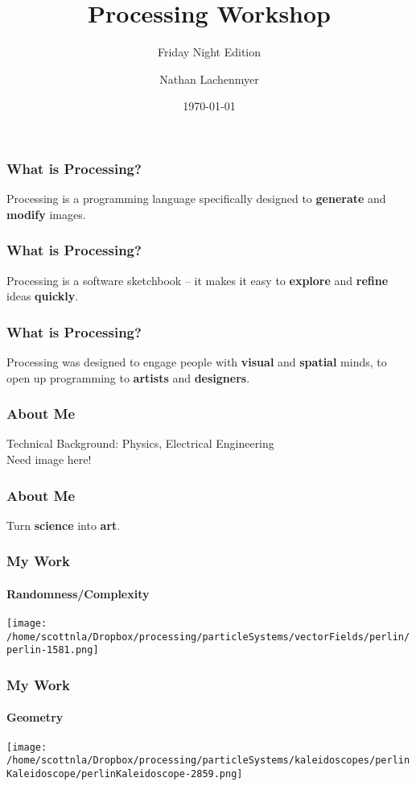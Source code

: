 \documentclass[xcolor=dvipsnames]{beamer}
\title{Processing Workshop}
\subtitle{Friday Night Edition}
\author{Nathan Lachenmyer}
\institute{CEMI Electronic Media Institute}
\date{\today}
\begin{document}
\begin{frame}
  \titlepage
\end{frame}

\begin{frame}
\frametitle{What is Processing?}
\begin{center}
Processing is a programming language specifically designed to \textbf{generate} and \textbf{modify} images.
\end{center}
\end{frame}

\begin{frame}
\frametitle{What is Processing?}
\begin{center}
Processing is a software sketchbook -- it makes it easy to \textbf{explore} and \textbf{refine} ideas \textbf{quickly}.
\end{center}
\end{frame}

\begin{frame}
\frametitle{What is Processing?}
\begin{center}
Processing was designed to engage people with \textbf{visual} and \textbf{spatial} minds, to open up programming to \textbf{artists} and \textbf{designers}.
\end{center}
\end{frame}

\begin{frame}
\frametitle{About Me}
Technical Background: Physics, Electrical Engineering \\
Need image here!
\end{frame}

\begin{frame}
\frametitle{About Me}
\begin{center}
Turn \textbf{science} into \textbf{art}.
\end{center}
\end{frame}

\begin{frame}
\frametitle{My Work}
\framesubtitle{Randomness/Complexity}
\begin{center}
\texttt{[image: /home/scottnla/Dropbox/processing/particleSystems/vectorFields/perlin/perlin-1581.png]}
\end{center}
\end{frame}

\begin{frame}
\frametitle{My Work}
\framesubtitle{Geometry}
\begin{center}
\texttt{[image: /home/scottnla/Dropbox/processing/particleSystems/kaleidoscopes/perlinKaleidoscope/perlinKaleidoscope-2859.png]}
\end{center}
\end{frame}
\end{document}
